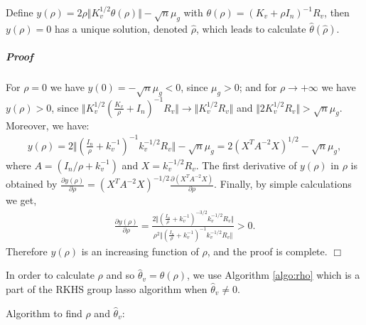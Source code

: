 \begin{rem}
Define $y(\rho)=2\rho\Vert K_v^{1/2}\theta(\rho)\Vert -\sqrt{n}\mu_g$ with $\theta(\rho)=(K_v+\rho I_n)^{-1}R_v$, then $y(\rho)=0$ has a unique solution, denoted $\widehat{\rho}$, which leads to calculate $\widehat{\theta}(\widehat{\rho})$.
\end{rem}
\subparagraph*{Proof}
For $\rho=0$ we have $y(0)=-\sqrt{n}\mu_g<0$, since $\mu_g>0$; and for $\rho\rightarrow +\infty$ we have $y(\rho)>0$, since $\Vert K_v^{1/2}(\frac{K_v}{\rho}+I_n)^{-1}R_v\Vert\rightarrow\Vert K_v^{1/2}R_v\Vert$ and $\Vert 2K_v^{1/2}R_v\Vert >\sqrt{n}\mu_g$. 
Moreover, we have: 
\begin{align*}
y(\rho)=2\Vert (\frac{I_n}{\rho}+k_v^{-1})^{-1}k_v^{-1/2}R_v\Vert-\sqrt{n}\mu_g
=2(X^TA^{-2}X)^{1/2}-\sqrt{n}\mu_g,
\end{align*}
where $A=(I_n/\rho+k_v^{-1})$ and $X=k_v^{-1/2}R_v$. 
The first derivative of $y(\rho)$ in $\rho$ is obtained by $\frac{\partial y(\rho)}{\partial\rho}=(X^TA^{-2}X)^{-1/2}\frac{\partial (X^TA^{-2}X)}{\partial\rho}$. Finally, by simple calculations we get,  
\begin{align*}
\frac{\partial y(\rho)}{\partial\rho}=\frac{2\Vert (\frac{I_n}{\rho}+k_v^{-1})^{-3/2}k_v^{-1/2}R_v\Vert}{\rho^2\Vert (\frac{I_n}{\rho}+k_v^{-1})^{-1}k_v^{-1/2}R_v\Vert}>0.
\end{align*}
Therefore $y(\rho)$ is an increasing function of $\rho$, and the proof is complete.
\hfill $\Box$ 

In order to calculate $\rho$ and so $\widehat{\theta}_v=\theta(\rho)$, we use Algorithm \ref{algo:rho} which is a part of the RKHS group lasso algorithm when $\widehat{\theta}_v\neq 0$.
\begin{algorithm}[h!]
\caption{Algorithm to find $\rho$ and $\widehat{\theta}_v$:}\label{algo:rho}
\small{
{\setlength{\tabcolsep}{4pt}
\begin{algorithmic}[1]
 
 \Else
 \Repeat
 \EndIf 
\Else
{}
 \Repeat
 \Else
 \Repeat
 \EndIf 
\EndIf 
{}
\end{algorithmic}}}
\end{algorithm}
